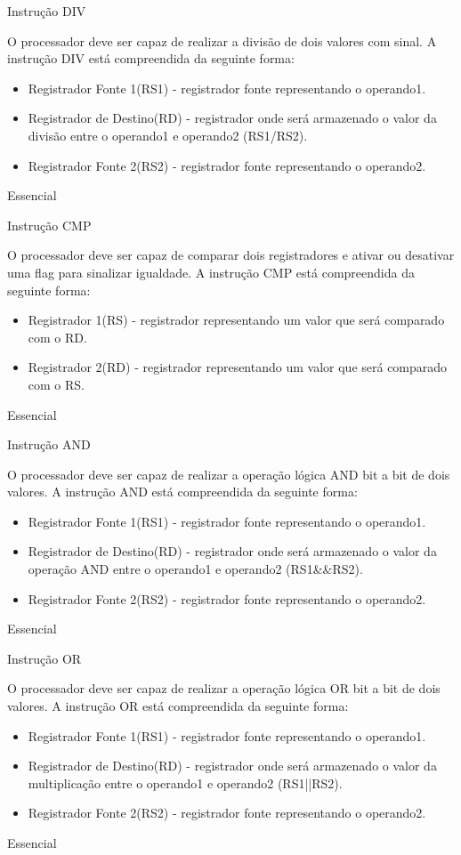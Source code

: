 \documentclass{article}
\begin{document}
\begin{functional}
       \requirement
      {Instrução DIV}
      {O processador deve ser capaz de realizar a divisão de dois valores com sinal.
      A instrução DIV está compreendida da seguinte forma:
       \begin{itemize}
        \item Registrador Fonte 1(RS1) - registrador fonte representando o operando1.
        \item Registrador de Destino(RD) - registrador onde será armazenado o valor da divisão entre o operando1 e operando2 (RS1/RS2).
        \item Registrador Fonte 2(RS2) - registrador fonte representando o operando2.
       \end{itemize}}
      {Essencial}
      
     \requirement
      {Instrução CMP}
      {O processador deve ser capaz de comparar dois registradores e ativar ou desativar uma flag para sinalizar igualdade.
      A instrução CMP está compreendida da seguinte forma:
      \begin{itemize}
       \item Registrador 1(RS) - registrador representando um valor que será comparado com o RD.
       \item Registrador 2(RD) - registrador representando um valor que será comparado com o RS.
      \end{itemize}

      {Essencial}
      
      \requirement
      {Instrução AND}
      {O processador deve ser capaz de realizar a operação lógica AND bit a bit de dois valores.      
      A instrução AND está compreendida da seguinte forma:
       \begin{itemize}
        \item Registrador Fonte 1(RS1) - registrador fonte representando o operando1.
        \item Registrador de Destino(RD) - registrador onde será armazenado o valor da operação AND entre o operando1 e operando2 (RS1&&RS2).
        \item Registrador Fonte 2(RS2) - registrador fonte representando o operando2.
       \end{itemize}}
      {Essencial}

      \requirement
      {Instrução OR}
      {O processador deve ser capaz de realizar a operação lógica OR bit a bit de dois valores.
      A instrução OR está compreendida da seguinte forma:
       \begin{itemize}
        \item Registrador Fonte 1(RS1) - registrador fonte representando o operando1.
        \item Registrador de Destino(RD) - registrador onde será armazenado o valor da multiplicação entre o operando1 e operando2 (RS1||RS2).
        \item Registrador Fonte 2(RS2) - registrador fonte representando o operando2.
       \end{itemize}}
      {Essencial}
      
}
\end{functional}
\end{document}
